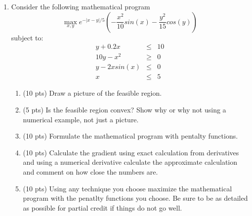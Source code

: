 \documentclass[12pt]{article}
\begin{document}
\begin{enumerate}
\pagebreak
\item Consider the following mathematical program
\[ \max_{x,y} e^{-|x-y|/5}\left( -\frac{x^2}{10}sin(x)-\frac{y^2}{15}cos(y) \right) \]
subject to:
\begin{eqnarray*}
  y + 0.2x &\le & 10 \\
  10y - x^2 &\ge & 0 \\
  y - 2xsin(x) & \le & 0 \\
  x & \le & 5
\end{eqnarray*}
\begin{enumerate}
  \item (10 pts) Draw a picture of the feasible region.
  \item (5 pts) Is the feasible region convex?  Show why or why not using a numerical example, not just a picture.
  \item (10 pts) Formulate the mathematical program with pentalty functions.
  \item (10 pts) Calculate the gradient using exact calculation from derivatives and using a numerical derivative calculate the approximate calculation and comment on how close the numbers are.
  \item (10 pts) Using any technique you choose maximize the mathematical program with the penatlty functions you choose.  Be sure to be as detailed as possible for partial credit if things do not go well. 
\end{enumerate}

\end{enumerate}
\end{document}
